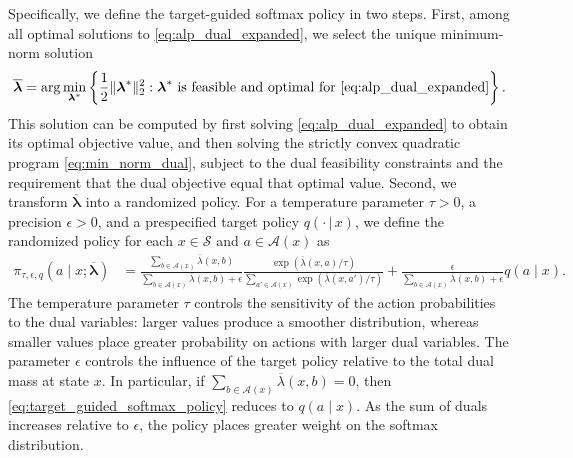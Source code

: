 \documentclass[sglanonrev]{informs4}
\providecommand{\blambda}{\boldsymbol{\lambda}}
\begin{document}
Specifically, we define the target-guided softmax policy in two steps.
First, among all optimal solutions to \eqref{eq:alp_dual_expanded}, we
select the unique minimum-norm solution
\begin{equation}
  \label{eq:min_norm_dual}
  \overline{\blambda}
  =
  \arg\min_{\blambda^*}
  \left\{
  \frac{1}{2}\lVert\blambda^*\rVert_2^2
  :
  \blambda^*
  \text{ is feasible and optimal for \eqref{eq:alp_dual_expanded}}
  \right\}.
\end{equation}
This solution can be computed by first solving
\eqref{eq:alp_dual_expanded} to obtain its optimal objective value, and
then solving the strictly convex quadratic program
\eqref{eq:min_norm_dual}, subject to the dual feasibility constraints
and the requirement that the dual objective equal that optimal value. Second, we transform $\overline{\blambda}$ into a randomized policy. For
a temperature parameter $\tau>0$, a precision $\epsilon>0$, and a prespecified target policy $q(\cdot \,|\, x)$, we define the randomized policy for each $x \in \mathcal S$ and $a \in \mathcal A(x)$ as
%
\begin{equation}
\label{eq:target_guided_softmax_policy}
\begin{aligned}
\pi_{\tau,\epsilon,q}(a\mid x;\overline{\blambda})
&=
\frac{\sum_{b\in\mathcal A(x)}\overline{\lambda}(x,b)}
     {\sum_{b\in\mathcal A(x)}\overline{\lambda}(x,b)+\epsilon}
\frac{\exp\!\left(\overline{\lambda}(x,a)/\tau\right)}
     {\sum_{a'\in\mathcal A(x)}\exp\!\left(\overline{\lambda}(x,a')/\tau\right)}
+
\frac{\epsilon}
     {\sum_{b\in\mathcal A(x)}\overline{\lambda}(x,b)+\epsilon}
q(a\mid x).
\end{aligned}
\end{equation}
%
The temperature parameter $\tau$ controls the sensitivity of the action probabilities to the dual variables: larger values produce a smoother distribution, whereas smaller values place greater probability on actions with larger dual variables. The parameter $\epsilon$ controls the influence of the target policy relative to the total dual mass at state $x$. In particular, if $\sum_{b\in\mathcal A(x)}\overline{\lambda}(x,b)=0$, then \eqref{eq:target_guided_softmax_policy} reduces to $q(a\mid x)$. As the sum of duals increases relative to $\epsilon$, the policy places greater weight on the softmax distribution.
\end{document}
